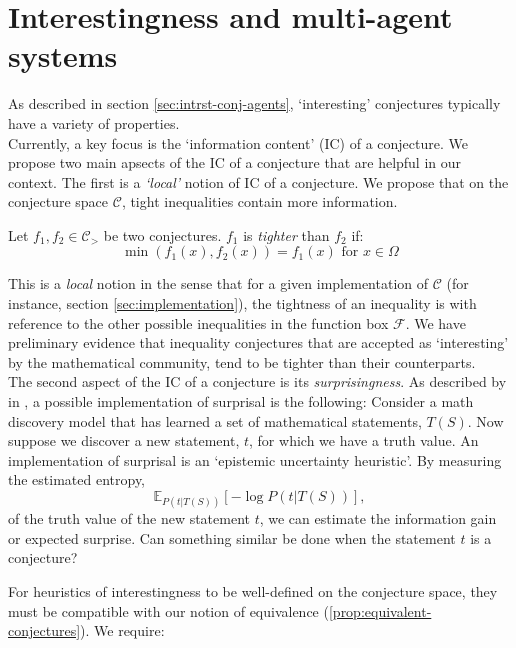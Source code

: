 \section{Interestingness and multi-agent systems}
\label{sec:intrst-multi-agent}
As described in section \ref{sec:intrst-conj-agents}, `interesting' conjectures typically have a variety of properties.\\
Currently, a key focus is the `information content' (IC) of a conjecture. We propose two main apsects of the IC of a conjecture that are helpful in our context. The first is a \textit{`local'} notion of IC of a conjecture. We propose that on the conjecture space $\mathcal{C}$, tight inequalities contain more information.
\begin{definition}
    \label{def:tight-ineq}
    Let $f_1, f_2\in\mathcal{C}_>$ be two conjectures. $f_1$ is \textit{tighter} than $f_2$ if:
    \begin{equation*}
        \min(f_1(x), f_2(x)) = f_1(x) \text{ for } x\in\Omega
    \end{equation*}
\end{definition}
This is a \textit{local} notion in the sense that for a given implementation of $\mathcal{C}$ (for instance, section \ref{sec:implementation}), the tightness of an inequality is with reference to the other possible inequalities in the function box $\mathcal{F}$. We have preliminary evidence that inequality conjectures that are accepted as `interesting' by the mathematical community, tend to be tighter than their counterparts. \\
The second aspect of the IC of a conjecture is its \textit{surprisingness}. As described by \citeauthor{bengioMachineLearningInformation2024} in \cite{bengioMachineLearningInformation2024}, a possible implementation of surprisal is the following:
Consider a math discovery model that has learned a set of mathematical statements, $T(S)$. Now suppose we discover a new statement, $t$, for which we have a truth value. An implementation of surprisal is an `epistemic uncertainty heuristic'. By measuring the estimated entropy,
\begin{equation*}
    \mathbb{E}_{P(t|T(S))}[-\log P(t|T(S))],
\end{equation*}
of the truth value of the new statement $t$, we can estimate the information gain or expected surprise.
Can something similar be done when the statement $t$ is a conjecture?
\par For heuristics of interestingness to be well-defined on the conjecture space, they must be compatible with our notion of equivalence (\ref{prop:equivalent-conjectures}). We require:
